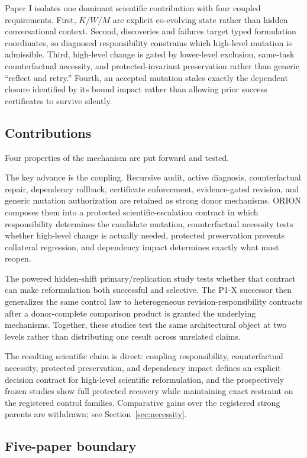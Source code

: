 Paper I isolates one dominant scientific contribution with four coupled requirements. First, $K/W/M$ are explicit co-evolving state rather than hidden conversational context. Second, discoveries and failures target typed formulation coordinates, so diagnosed responsibility constrains which high-level mutation is admissible. Third, high-level change is gated by lower-level exclusion, same-task counterfactual necessity, and protected-invariant preservation rather than generic ``reflect and retry.'' Fourth, an accepted mutation stales exactly the dependent closure identified by its bound impact rather than allowing prior success certificates to survive silently.
\subsection{Contributions}

Four properties of the mechanism are put forward and tested.

The key advance is the coupling. Recursive audit, active diagnosis, counterfactual repair, dependency rollback, certificate enforcement, evidence-gated revision, and generic mutation authorization are retained as strong donor mechanisms. ORION composes them into a protected scientific-escalation contract in which responsibility determines the candidate mutation, counterfactual necessity tests whether high-level change is actually needed, protected preservation prevents collateral regression, and dependency impact determines exactly what must reopen.

The powered hidden-shift primary/replication study tests whether that contract can make reformulation both successful and selective. The P1-X successor then generalizes the same control law to heterogeneous revision-responsibility contracts after a donor-complete comparison product is granted the underlying mechanisms. Together, these studies test the same architectural object at two levels rather than distributing one result across unrelated claims.

The resulting scientific claim is direct: coupling responsibility, counterfactual necessity, protected preservation, and dependency impact defines an explicit decision contract for high-level scientific reformulation, and the prospectively frozen studies show full protected recovery while maintaining exact restraint on the registered control families. Comparative gains over the registered strong parents are withdrawn; see Section~\ref{sec:necessity}.

\subsection{Five-paper boundary}

